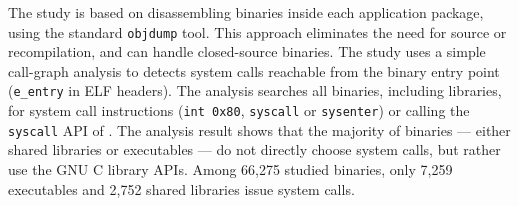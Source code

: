


The study is based on disassembling binaries inside each application package, using the standard {\tt objdump} tool.
This approach eliminates the need for source or recompilation, and can handle closed-source binaries.
The study uses a simple call-graph analysis to detects system calls reachable from the binary entry point ({\tt e\_entry} in ELF headers). 
The analysis searches all binaries, including libraries, for system call instructions ({\tt int 0x80}, {\tt syscall} or {\tt sysenter}) or calling the {\tt syscall} API of \libc{}.
The analysis result shows that the majority of binaries --- either shared libraries or executables --- do not directly choose system calls, but 
rather use the GNU C library APIs.
Among 66,275 studied binaries, only 7,259 executables and 2,752 shared libraries issue system calls.





